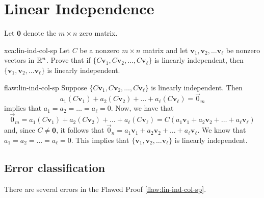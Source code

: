 \section{Linear Independence}

Let $\underline{\bm{0}}$ denote the $m\times n$ zero matrix.

\begin{xca}{xca:lin-ind-col-sp}
Let $C$ be a nonzero $m\times n$ matrix and let $\bm{v}_1, \bm{v}_2,\ldots \bm{v}_\ell$ be nonzero vectors in $\mathbb R^n$.  Prove that if $\{C\bm{v}_1,C\bm{v}_2,\ldots, C\bm{v}_\ell\}$ is linearly independent, then $\{\bm{v}_1, \bm{v}_2,\ldots \bm{v}_\ell\}$ is linearly independent.
\end{xca}

\begin{flaw}{flaw:lin-ind-col-sp}
Suppose $\{C\bm{v}_1,C\bm{v}_2,\ldots, C\bm{v}_\ell\}$ is linearly independent. Then
	\[a_1(C\bm{v}_1) + a_2(C\bm{v}_2) + \ldots + a_\ell (C\bm{v}_\ell) = \vec{0}_m\]
	implies that $
	a_1 = a_2 = \ldots = a_\ell = 0$.
	Now, we have that \[	\vec{0}_m = a_1(C\bm{v}_1) + a_2(C\bm{v}_2) + \ldots + a_\ell (C\bm{v}_\ell)
		 = C(a_1\bm{v}_1 + a_2\bm{v}_2 + \ldots + a_\ell\bm{v}_\ell) \]
and, since $C\neq \underline{\bm{0}}$, it follows that $\vec{0}_n = a_1\bm{v}_1 + a_2\bm{v}_2 + \ldots + a_\ell\bm{v}_\ell$.
We know that $a_1 = a_2 = \ldots = a_\ell = 0$.  This implies that $\{\bm{v}_1, \bm{v}_2,\ldots \bm{v}_\ell\}$ is linearly independent.
\end{flaw}

\clearpage
\subsection{Error classification}

There are several errors in the Flawed Proof \ref{flaw:lin-ind-col-sp}.

